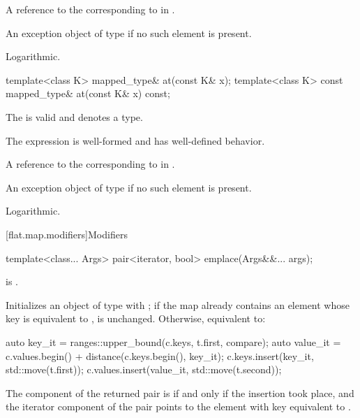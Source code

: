 \begin{itemdescr}
\pnum
\returns
A reference to the  corresponding
to  in .

\pnum
\throws
An exception object of type  if
no such element is present.

\pnum
\complexity
Logarithmic.
\end{itemdescr}

%
\begin{itemdecl}
template<class K> mapped_type&       at(const K& x);
template<class K> const mapped_type& at(const K& x) const;
\end{itemdecl}

\begin{itemdescr}
\pnum
\constraints
The  
is valid and denotes a type.

\pnum
\expects
The expression  is well-formed and has well-defined behavior.

\pnum
\returns
A reference to the  corresponding to
 in .

\pnum
\throws
An exception object of type 
if no such element is present.

\pnum
\complexity
Logarithmic.
\end{itemdescr}

[flat.map.modifiers]{Modifiers}

%
\begin{itemdecl}
template<class... Args> pair<iterator, bool> emplace(Args&&... args);
\end{itemdecl}

\begin{itemdescr}
\pnum
\constraints
{} is .

\pnum
\effects
Initializes an object  of type 
with ;
if the map already contains an element
whose key is equivalent to ,
 is unchanged.
Otherwise, equivalent to:
\begin{codeblock}
auto key_it = ranges::upper_bound(c.keys, t.first, compare);
auto value_it = c.values.begin() + distance(c.keys.begin(), key_it);
c.keys.insert(key_it, std::move(t.first));
c.values.insert(value_it, std::move(t.second));
\end{codeblock}

\pnum
\returns
The  component of the returned pair is 
if and only if the insertion took place, and
the iterator component of the pair points to
the element with key equivalent to .
\end{itemdescr}

